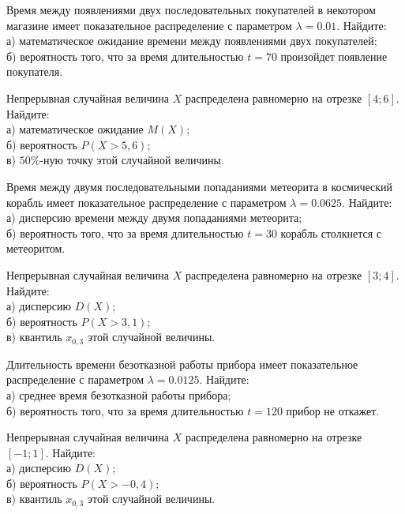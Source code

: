 \vfill

\z Время между появлениями двух последовательных покупателей в некотором магазине имеет показательное распределение с параметром $\lambda = 0.01$. Найдите: \\ \quad а) математическое ожидание времени между появлениями двух покупателей; \\ \quad б) вероятность того, что за время длительностью $t = 70$  произойдет появление покупателя.
 

\vfill

\newpage\setcounter{zad}{0}

\z Непрерывная случайная величина $X$ распределена равномерно на отрезке $[4; 6]$. Найдите: \\ \quad а) математическое ожидание $M(X)$; \\ \quad б) вероятность $P(X>5{,}6)$; \\ \quad в) $50\%$-ную точку этой случайной величины.


\vfill

\z Время между двумя последовательными попаданиями метеорита в космический корабль имеет показательное распределение с параметром $\lambda = 0.0625$. Найдите: \\ \quad а) дисперсию времени между двумя попаданиями метеорита; \\ \quad б) вероятность того, что за время длительностью $t = 30$ корабль  столкнется с метеоритом.
 

\vfill

\newpage\setcounter{zad}{0}

\z Непрерывная случайная величина $X$ распределена равномерно на отрезке $[3; 4]$. Найдите: \\ \quad а) дисперсию $D(X)$; \\ \quad б) вероятность $P(X>3{,}1)$; \\ \quad в) квантиль $x_{0{,}3}$ этой случайной величины.


\vfill

\z Длительность времени безотказной работы прибора имеет показательное распределение с параметром $\lambda = 0.0125$. Найдите: \\ \quad а) среднее время безотказной работы прибора; \\ \quad б) вероятность того, что за время длительностью $t = 120$ прибор не откажет.
 

\vfill

\newpage\setcounter{zad}{0}

\z Непрерывная случайная величина $X$ распределена равномерно на отрезке $[-1; 1]$. Найдите: \\ \quad а) дисперсию $D(X)$; \\ \quad б) вероятность $P(X>-0{,}4)$; \\ \quad в) квантиль $x_{0{,}3}$ этой случайной величины.


